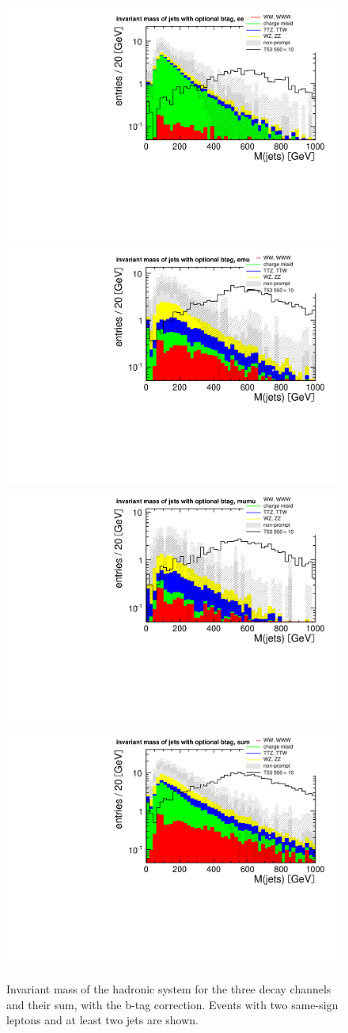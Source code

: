 \begin{figure}[htb]
    \centering
    \includegraphics[width=.7\textwidth]{images/pdf/had_mass_optional_btag_ee_0}
    \includegraphics[width=.7\textwidth]{images/pdf/had_mass_optional_btag_emu_0}
    \includegraphics[width=.7\textwidth]{images/pdf/had_mass_optional_btag_mumu_0}
    \includegraphics[width=.7\textwidth]{images/pdf/had_mass_optional_btag_sum_0}
    \caption{Invariant mass of the hadronic system for the three decay
    channels and their sum, with the b-tag correction. Events with two same-sign leptons and at least
two jets are shown.}
    \label{fig:had_mass_optional_btag}
\end{figure}

